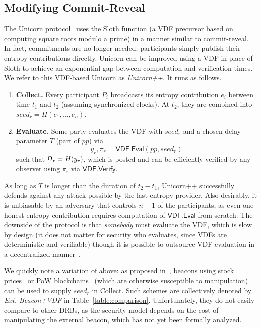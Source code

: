 \subsection{Modifying Commit-Reveal}
\label{subsection:modifying-commit-reveal}
The Unicorn protocol~\cite{lenstra2015random} uses the Sloth function (a VDF precursor based on computing square roots modulo a prime) in a manner similar to commit-reveal. In fact, commitments are no longer needed; participants simply publish their entropy contributions directly. Unicorn can be improved using a VDF in place of Sloth to achieve an exponential gap between computation and verification times. We refer to this VDF-based Unicorn as \textit{Unicorn++}. It runs as follows.
\begin{enumerate}
    \item \textbf{Collect.} Every participant $P_i$ broadcasts its entropy contribution $e_i$ between time $t_1$ and $t_2$ (assuming synchronized clocks). At $t_2$, they are combined into $seed_r = H(e_1,\ldots, e_n)$.
    \item \textbf{Evaluate.} Some party evaluates the VDF with $seed_r$ and a chosen delay parameter $T$ (part of $pp$) via
    $$y_r, \pi_r = \mathsf{VDF.Eval}(pp, seed_r)$$
    such that $\Omega_r = H(y_r)$, which is posted and can be efficiently verified by any observer using $\pi_r$ via $\mathsf{VDF.Verify}$.
\end{enumerate}

As long as $T$ is longer than the duration of $t_2 - t_1$, Unicorn++ successfully defends against any attack possible by the last entropy provider. Also desirably, it is unbiasable by an adversary that controls $n - 1$ of the participants, as even one honest entropy contribution requires computation of $\mathsf{VDF.Eval}$ from scratch. The downside of the protocol is that \emph{somebody} must evaluate the VDF, which is slow by design (it does not matter for security who evaluates, since VDFs are deterministic and verifiable) though it is possible to outsource VDF evaluation in a decentralized manner~\cite{thyagarajan2021opensquare}.

We quickly note a variation of above: as proposed in~\cite{bunz2017proofs, bonneau2015bitcoin}, beacons using stock prices~\cite{clark2010use} or PoW blockchains~\cite{nakamoto2008bitcoin, bentov2016bitcoin, han2020randchain} (which are otherwise susceptible to manipulation) can be used to supply $seed_r$ in Collect. Such schemes are collectively denoted by \textit{Ext. Beacon+VDF} in Table~\ref{table:comparison}.
Unfortunately, they do not easily compare to other DRBs, as the security model depends on the cost of manipulating the external beacon, which has not yet been formally analyzed.

